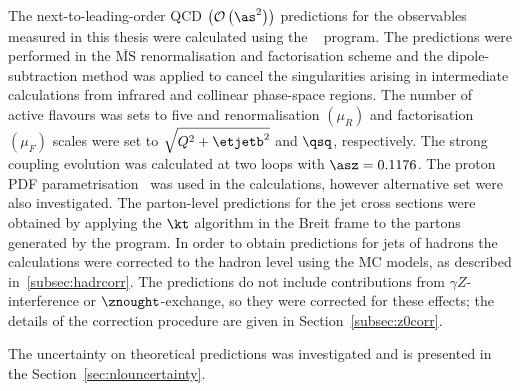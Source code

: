 The next-to-leading-order QCD $ \left( \mathcal{O}\left( \as^2\right) \right) $ predictions for the observables measured in this thesis were calculated using the \nlojet~\cite{Nagy:1998bb, Nagy:2001xb} program. The predictions were performed in the $\overline{\text{MS}}$ renormalisation and factorisation scheme and the dipole-subtraction method was applied to cancel the singularities arising in intermediate calculations from infrared and collinear phase-space regions. The number of active flavours was sets to five and renormalisation $\left( \mu_R \right) $ and factorisation $\left( \mu_F \right) $ scales were set to $\sqrt{Q^2+\etjetb^2}$ and $\qsq$, respectively. The strong coupling evolution was calculated at two loops with $\asz=0.1176$. The  proton PDF parametrisation~\cite{upub:herapdf1.5} was used in the calculations, however alternative set were also investigated. The parton-level predictions for the jet cross sections were obtained by applying the $\kt$ algorithm in the Breit frame to the partons generated by the program. In order to obtain predictions for jets of hadrons the calculations were corrected to the hadron level using the MC models, as described in~\ref{subsec:hadrcorr}. The predictions do not include contributions from $\gamma Z$-interference or $\znought$-exchange, so they were corrected for these effects; the details of the correction procedure are given in Section~\ref{subsec:z0corr}. 

The uncertainty on theoretical predictions was investigated and is presented in the Section~\ref{sec:nlouncertainty}.